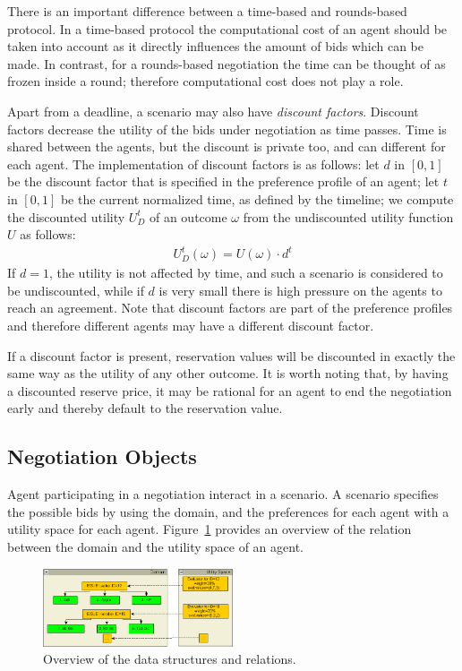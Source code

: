 \documentclass[]{article}
\begin{document}
There is an important difference between a time-based and rounds-based protocol. In a time-based protocol the computational cost of an agent should be taken into account as it directly influences the amount of bids which can be made. In contrast, for a rounds-based negotiation the time can be thought of as frozen inside a round; therefore computational cost does not play a role.

Apart from a deadline, a scenario may also have \emph{discount factors}. Discount factors decrease the utility of the bids under negotiation as time passes. Time is shared between the agents, but the discount is private too, and can different for each agent. The implementation of discount factors is as follows: let $d$ in $[0, 1]$ be the discount factor that is specified in the preference profile of an agent; let $t$ in $[0, 1]$ be the current normalized time, as defined by the timeline; we compute the discounted utility $U_D^t$ of an outcome $\omega$ from the undiscounted utility function $U$ as follows:
\begin{eqnarray}
U_D^t(\omega) = U(\omega) \cdot d^t
\end{eqnarray}
If $d = 1$, the utility is not affected by time, and such a scenario is considered to be undiscounted, while if $d$ is very small there is high pressure on the agents to reach an agreement. Note that discount factors are part of the preference profiles and therefore different agents may have a different discount factor.

If a discount factor is present, reservation values will be discounted in exactly the same way as the utility of any other outcome. It is worth noting that, by having a discounted reserve price, it may be rational for an agent to end the negotiation early and thereby default to the reservation value.

\subsection{Negotiation Objects}
Agent participating in a negotiation interact in a scenario. A scenario specifies the possible bids by using the domain, and the preferences for each agent with a utility space for each agent. Figure~\ref{Fig:overviewStructures} provides an overview of the relation between the domain and the utility space of an agent.

\begin{figure}[htb]
	\centering
	\includegraphics[width=0.5\textwidth]{media/datastructures.png}
	\caption{Overview of the data structures and relations.}\label{Fig:overviewStructures}
\end{figure}
\end{document}
